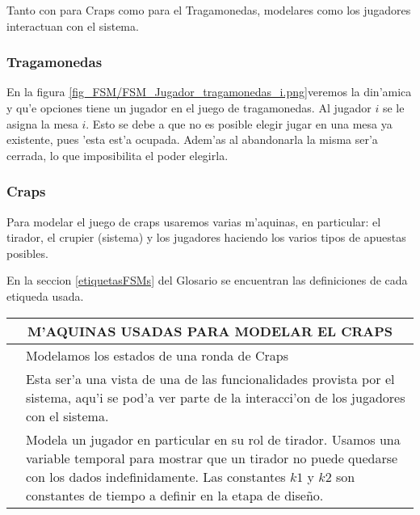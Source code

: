 
\newcommand{\ronda}{ \italica{ FSM Ronda} }
\newcommand{\crupier}{ \italica{ FSM Crupier} }
\newcommand{\tirador}{ \italica{ FSM Tirador i} }
\newcommand{\dados}{ \italica{ FSM Dados i} }
\newcommand{\campo}{\italica{FSM Jugador i haciendo apuesta de Campo }}
\newcommand{\sitio}{\italica{FSM Jugador i haciendo apuesta de sitio}}
\newcommand{\pase}{\italica{FSM Jugador i haciendo apuesta linea de pase / Barra NoPase}}
\newcommand{\venir}{\italica{FSM Jugador i haciendo apuesta venir novenir}}

Tanto con para Craps como para el Tragamonedas, modelares como los jugadores interactuan con el sistema.

\subsubsection{Tragamonedas}

En la figura \ref{fig_FSM/FSM_Jugador_tragamonedas_i.png}veremos la din'amica y qu'e opciones tiene un jugador en el juego de tragamonedas.
Al jugador $i$ se le asigna la mesa $i$. Esto se debe a que no es posible elegir jugar en una mesa ya existente, pues 'esta est'a ocupada. Adem'as al abandonarla la misma ser'a cerrada, lo que imposibilita el poder elegirla.

\clearpage


\subsubsection{Craps}
\label{FSM:Craps}
Para modelar el juego de craps usaremos varias m'aquinas, en particular:
el tirador, el crupier (sistema) y los jugadores haciendo los varios tipos de apuestas
posibles. 

En la seccion \ref{etiquetasFSMs} del Glosario se encuentran las definiciones de cada etiqueda usada.

 
\begin{center}
\begin{tabular}{p{4cm}|p{12cm}}        
         \multicolumn{2}{c}{M'AQUINAS USADAS PARA MODELAR EL CRAPS}     \\
        \hline
        \ronda & Modelamos los estados de una ronda de Craps \\
        \hline
        \crupier & Esta ser'a una vista de una de las funcionalidades provista por el sistema, aqu'i se pod'a ver parte de la interacci'on de los jugadores con el sistema. \\
         \hline 
         \tirador  & Modela un jugador en particular en su rol de tirador. Usamos una variable temporal para mostrar que un tirador no puede quedarse con los dados indefinidamente. Las constantes $k1$ y $k2$ son constantes de tiempo a definir en la etapa de dise\~{n}o.\\
\end{tabular}
\end{center}

